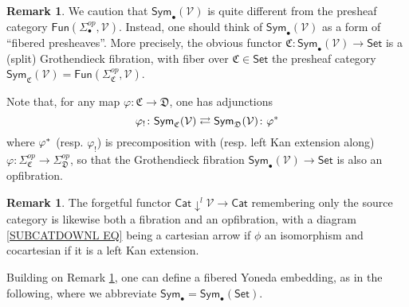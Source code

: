 \documentclass[a4paper,10pt
,draft
]{article}%
\numberwithin{equation}{section}
\numberwithin{figure}{section}
\theoremstyle{definition} %
\newtheorem{remark}[equation]{Remark}%
\newcommand{\Sym}{\ensuremath{\mathsf{Sym}}}%
\newcommand{\V}{\ensuremath{\mathcal V}}
\newcommand{\1}{\ensuremath{\mathbbm 1}}%
\begin{document}
\begin{remark}\label{COLCHADJ REM}
	We caution that 
	$\mathsf{Sym}_{\bullet}(\V)$
	is quite different from the presheaf category 
	$\mathsf{Fun}(\Sigma_{\bullet}^{op},\V)$.
	Instead, one should think of 
	$\mathsf{Sym}_{\bullet}(\V)$
	as a form of ``fibered presheaves''.
	More precisely,
        the obvious functor
        $\mathfrak C \colon \mathsf{Sym}_{\bullet}(\V) \to \mathsf{Set}$
        is a (split) Grothendieck fibration,
	with fiber over 
	$\mathfrak{C} \in \mathsf{Set}$
	the presheaf category
	$\Sym_{\mathfrak C}(\V)=
	\mathsf{Fun}(\Sigma_{\mathfrak{C}}^{op},\mathcal{V})$.

	Note that,
	for any map $\varphi \colon \mathfrak{C} \to \mathfrak{D}$,
	one has adjunctions
	\begin{equation}\label{COLCHADJ EQ}
	\varphi_! \colon \Sym_{\mathfrak C}(\V) 
	\rightleftarrows 
	\Sym_{\mathfrak D}(\V) \colon \varphi^{\**}
	\end{equation}
	where $\varphi^{\**}$
	(resp. $\varphi_!$)
	is precomposition with (resp. left Kan extension along)
	$\varphi\colon 
	\Sigma^{op}_{\mathfrak{C}}
	\to 
	\Sigma^{op}_{\mathfrak{D}}$,
	so that the Grothendieck fibration
	$\mathsf{Sym}_{\bullet}(\V) \to \mathsf{Set}$
	is also an opfibration. 
\end{remark}


\begin{remark}\label{SUBCOCART REM}
	The forgetful functor $\mathsf{Cat} \downarrow^l \mathcal{V} \to \mathsf{Cat}$
	remembering only the source category is likewise both a fibration and an opfibration, 
	with a diagram \eqref{SUBCATDOWNL EQ}
	being a cartesian arrow if  $\phi$ an isomorphism
	and cocartesian if it is a left Kan extension. 
\end{remark}


Building on Remark \ref{COLCHADJ REM},
one can define a fibered Yoneda embedding, as in the following,
where we abbreviate
$\mathsf{Sym}_{\bullet} = \mathsf{Sym}_{\bullet}(\mathsf{Set})$.
\end{document}
